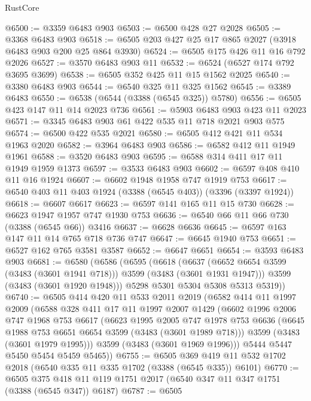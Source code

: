 \begin{lexlean}{RustCore}
\begin{coremodule}
@6500 := @3359 @6483 @903
@6503 := @6500 @428 @27 @2028
@6505 := @3368 @6483 @903
@6518 := @6505 @203 @427 @25 @17 @865 @2027 (@3918 @6483 @903 @200 @25 @864 @3930)
@6524 := @6505 @175 @426 @11 @16 @792 @2026
@6527 := @3570 @6483 @903 @11
@6532 := @6524 (@6527 @174 @792 @3695 @3699)
@6538 := @6505 @352 @425 @11 @15 @1562 @2025
@6540 := @3380 @6483 @903
@6544 := @6540 @325 @11 @325 @1562
@6545 := @3389 @6483
@6550 := @6538 (@6544 (@3388 (@6545 @325)) @5780)
@6556 := @6505 @423 @147 @11 @14 @2023 @736
@6561 := @5903 @6483 @903 @423 @11 @2023
@6571 := @3345 @6483 @903 @61 @422 @535 @11 @718 @2021 @903 @575
@6574 := @6500 @422 @535 @2021
@6580 := @6505 @412 @421 @11 @534 @1963 @2020
@6582 := @3964 @6483 @903
@6586 := @6582 @412 @11 @1949 @1961
@6588 := @3520 @6483 @903
@6595 := @6588 @314 @411 @17 @11 @1949 @1959 @1373
@6597 := @3533 @6483 @903
@6602 := @6597 @408 @410 @11 @16 @1924
@6607 := @6602 @1948 @1958 @747 @1919 @753
@6617 := @6540 @403 @11 @403 @1924 (@3388 (@6545 @403)) (@3396 (@3397 @1924))
@6618 := @6607 @6617
@6623 := @6597 @141 @165 @11 @15 @730
@6628 := @6623 @1947 @1957 @747 @1930 @753
@6636 := @6540 @66 @11 @66 @730 (@3388 (@6545 @66)) @3416
@6637 := @6628 @6636
@6645 := @6597 @163 @147 @11 @14 @765 @718 @736 @747
@6647 := @6645 @1940 @753
@6651 := @6527 @162 @765 @3581 @3587
@6652 := @6647 @6651
@6654 := @3593 @6483 @903
@6681 := @6580
    (@6586
      (@6595
        (@6618
          (@6637 (@6652 @6654 @3599 (@3483 (@3601 @1941 @718))) @3599 (@3483 (@3601 @1931 @1947)))
          @3599
          (@3483 (@3601 @1920 @1948)))
        @5298
        @5301
        @5304
        @5308
        @5313
        @5319))
@6740 := @6505
    @414
    @420
    @11
    @533
    @2011
    @2019
    (@6582
      @414
      @11
      @1997
      @2009
      (@6588
        @328
        @411
        @17
        @11
        @1997
        @2007
        @1429
        (@6602
          @1996
          @2006
          @747
          @1968
          @753
          @6617
          (@6623
            @1995
            @2005
            @747
            @1978
            @753
            @6636
            (@6645 @1988 @753 @6651 @6654 @3599 (@3483 (@3601 @1989 @718)))
            @3599
            (@3483 (@3601 @1979 @1995)))
          @3599
          (@3483 (@3601 @1969 @1996)))
        @5444
        @5447
        @5450
        @5454
        @5459
        @5465))
@6755 := @6505 @369 @419 @11 @532 @1702 @2018 (@6540 @335 @11 @335 @1702 (@3388 (@6545 @335)) @6101)
@6770 := @6505 @375 @418 @11 @119 @1751 @2017 (@6540 @347 @11 @347 @1751 (@3388 (@6545 @347)) @6187)
@6787 := @6505

\end{coremodule}
\end{lexlean}
